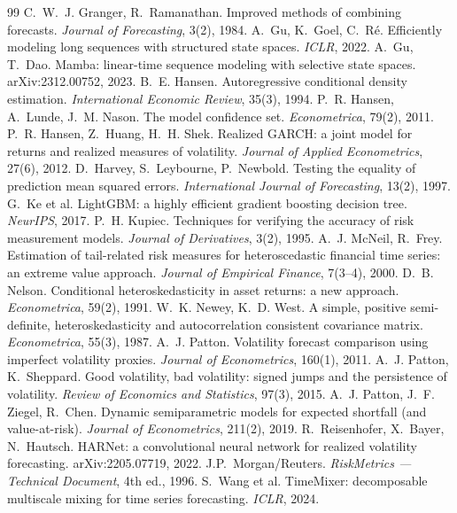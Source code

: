 \documentclass[11pt,a4paper]{article}
\begin{document}
\begin{thebibliography}{99}
 C.~W.~J. Granger, R.~Ramanathan. Improved methods of combining forecasts. \emph{Journal of Forecasting}, 3(2), 1984.
 A.~Gu, K.~Goel, C.~R\'e. Efficiently modeling long sequences with structured state spaces. \emph{ICLR}, 2022.
 A.~Gu, T.~Dao. Mamba: linear-time sequence modeling with selective state spaces. arXiv:2312.00752, 2023.
 B.~E. Hansen. Autoregressive conditional density estimation. \emph{International Economic Review}, 35(3), 1994.
 P.~R. Hansen, A.~Lunde, J.~M. Nason. The model confidence set. \emph{Econometrica}, 79(2), 2011.
 P.~R. Hansen, Z.~Huang, H.~H. Shek. Realized GARCH: a joint model for returns and realized measures of volatility. \emph{Journal of Applied Econometrics}, 27(6), 2012.
 D.~Harvey, S.~Leybourne, P.~Newbold. Testing the equality of prediction mean squared errors. \emph{International Journal of Forecasting}, 13(2), 1997.
 G.~Ke et al. LightGBM: a highly efficient gradient boosting decision tree. \emph{NeurIPS}, 2017.
 P.~H. Kupiec. Techniques for verifying the accuracy of risk measurement models. \emph{Journal of Derivatives}, 3(2), 1995.
 A.~J. McNeil, R.~Frey. Estimation of tail-related risk measures for heteroscedastic financial time series: an extreme value approach. \emph{Journal of Empirical Finance}, 7(3--4), 2000.
 D.~B. Nelson. Conditional heteroskedasticity in asset returns: a new approach. \emph{Econometrica}, 59(2), 1991.
 W.~K. Newey, K.~D. West. A simple, positive semi-definite, heteroskedasticity and autocorrelation consistent covariance matrix. \emph{Econometrica}, 55(3), 1987.
 A.~J. Patton. Volatility forecast comparison using imperfect volatility proxies. \emph{Journal of Econometrics}, 160(1), 2011.
 A.~J. Patton, K.~Sheppard. Good volatility, bad volatility: signed jumps and the persistence of volatility. \emph{Review of Economics and Statistics}, 97(3), 2015.
 A.~J. Patton, J.~F. Ziegel, R.~Chen. Dynamic semiparametric models for expected shortfall (and value-at-risk). \emph{Journal of Econometrics}, 211(2), 2019.
 R.~Reisenhofer, X.~Bayer, N.~Hautsch. HARNet: a convolutional neural network for realized volatility forecasting. arXiv:2205.07719, 2022.
 J.P.~Morgan/Reuters. \emph{RiskMetrics --- Technical Document}, 4th ed., 1996.
 S.~Wang et al. TimeMixer: decomposable multiscale mixing for time series forecasting. \emph{ICLR}, 2024.
\end{thebibliography}
\end{document}
